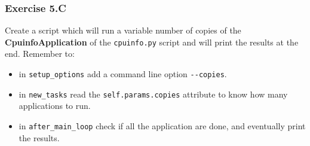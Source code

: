 \documentclass[english,serif,mathserif,xcolor=pdftex,dvipsnames,table]{beamer}
\begin{document}
\begin{frame}
  \frametitle{Exercise 5.C} Create a script which will run a variable
  number of copies of the \textbf{CpuinfoApplication} of the
  \lstinline|cpuinfo.py| script and will print the results at the
  end. Remember to:
  \begin{itemize}
  \item in \lstinline|setup_options| add a command line option
    \lstinline|--copies|.
  \item in \lstinline|new_tasks| read the
    \lstinline|self.params.copies| attribute to know how many
    applications to run.
  \item in \lstinline|after_main_loop| check if all the application
    are done, and eventually print the results.
  \end{itemize}
\end{frame}





\end{document}
